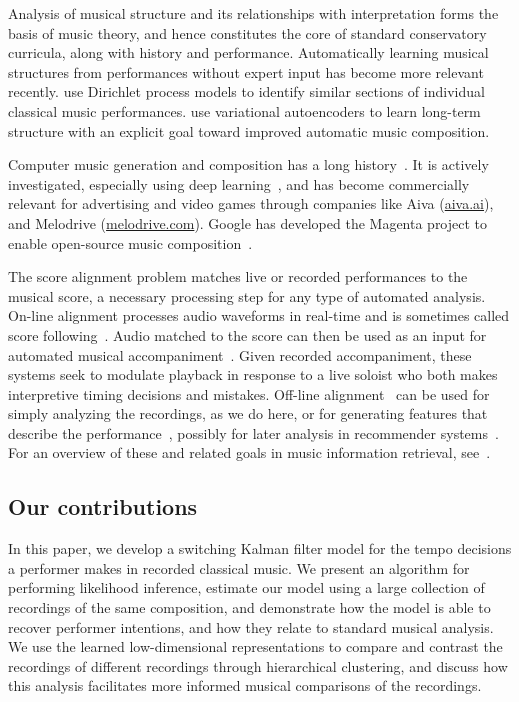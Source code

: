\documentclass[aoas]{imsart}
\begin{document}
Analysis of musical structure and its relationships with interpretation
forms the basis of music theory, and hence constitutes the core of standard
conservatory curricula, along with history and performance. Automatically learning musical structures
from performances without expert input has become more relevant
recently. \citet{RenDunson2010} use Dirichlet process models to identify
similar sections of individual classical music
performances. \citet{RobertsEngel2018} use variational autoencoders to
learn long-term structure with an explicit goal toward improved
automatic music composition.

Computer music generation and composition has a long
history~\citep{SturmBen-Tal2019,Boulanger-LewandowskiBengio2012,Collins2016,Ariza2005,FlossmannGrachten2013}.
It is actively investigated, especially using deep
learning~\citep{HadjeresPachet2017}, and has become commercially
relevant for advertising and video games through companies like
Aiva (\url{aiva.ai}), and Melodrive (\url{melodrive.com}). Google has
developed the Magenta project to enable open-source music
composition~\citep{RobertsHawthorne2018}.

The score alignment
problem matches live or recorded performances to the musical score, a necessary
processing step for any type of automated analysis. On-line alignment processes
audio waveforms in real-time 
and is sometimes called score
following~\citep{DannenbergRaphael2006,Cont2010,ContSchwarz2007,ArztWidmer2015}. Audio
matched to the score can then be used as an input for automated
musical accompaniment~\citep{Raphael2010,Vercoe1985,Dannenberg1985}.
Given recorded accompaniment, these systems seek to
modulate playback in response to a live soloist who both makes
interpretive timing decisions and mistakes. Off-line alignment~\citep{Earis2007} can be
used for simply analyzing the recordings, as we do here, or for
generating features that describe the
performance~\citep{ThickstunHarchaoui2017}, possibly for later analysis
in recommender
systems~\citep{McFeeLanckriet2011,OordDieleman2013}. For an overview
of these and related goals in music information retrieval, see~\citet{schedl2014music}.

\subsection{Our contributions}
\label{sec:our-contributions}

In this paper, we develop a switching Kalman filter model for the
tempo decisions a performer makes in recorded classical music. We
present an algorithm for performing likelihood inference, estimate our
model using a large collection of recordings of the same composition,
and demonstrate how the model is able to recover performer intentions,
and how they relate to standard musical analysis. We use the learned
low-dimensional representations to compare and contrast the recordings
of different recordings through hierarchical clustering, and 
discuss how this analysis facilitates more informed musical
comparisons of the recordings.
\end{document}
